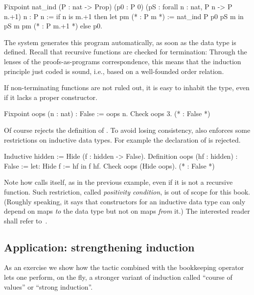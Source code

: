 \begin{coq}{}{}
Fixpoint nat_ind (P : nat -> Prop)
  (p0 : P 0) (pS : forall n : nat, P n -> P n.+1) n : P n :=
  if n is m.+1 then
    let pm (* : P m *) := nat_ind P p0 pS m in
    pS m pm (* : P m.+1 *)
  else p0.
\end{coq}

The \Coq{} system generates this program automatically, as soon as
 the  data type
is defined.  Recall that recursive functions are checked for termination:
Through the lenses of the proofs-as-programs correspondence, this means
that the induction principle just coded is sound, i.e., based on a
well-founded order relation.

If non-terminating functions are not ruled out, it is easy to inhabit
the  type, even if it lacks a proper constructor.

\begin{coq}{}{}
Fixpoint oops (n : nat) : False := oops n.
Check oops 3.  (* : False *)
\end{coq}
Of course \Coq{} rejects the definition of .  To avoid
losing consistency, \Coq{} also enforces some restrictions on
inductive data types.  For example the declaration of 
is rejected.

\begin{coq}{}{}
Inductive hidden := Hide (f : hidden -> False).
Definition oops (hf : hidden) : False := let: Hide f := hf in f hf.
Check oops (Hide oops).  (* : False *)
\end{coq}
Note how  calls itself, as in the previous example,
even if it is not a recursive function.
Such restriction, called
\emph{positivity condition}, is out of scope for this book.
(Roughly speaking, it says that constructors for an inductive data
type can only depend on maps \emph{to} the data type but not on maps
\emph{from} it.)
The interested reader shall refer to~\cite{Coq:manual}.

\subsection{Application: strengthening induction}
\label{sec:strongind}

As an exercise we show how the  tactic combined with the bookkeeping
operator \C{:} lets one perform, on the fly, a stronger variant of
induction called ``course of values'' or ``strong induction''.

